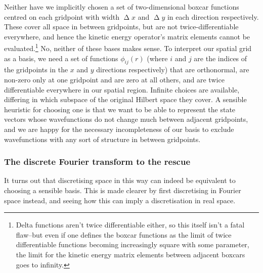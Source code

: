 Neither have we implicitly chosen a set of two-dimensional boxcar functions centred on each gridpoint with width $\upDelta x$ and $\upDelta y$ in each direction respectively. These cover all space in between gridpoints, but are not twice-differentiable everywhere, and hence the kinetic energy operator's matrix elements cannot be evaluated.\footnote{Delta functions aren't twice differentiable either, so this itself isn't a fatal flaw--but even if one defines the boxcar functions as the limit of twice differentiable functions becoming increasingly square with some parameter, the limit for the kinetic energy matrix elements between adjacent boxcars goes to infinity.} No, neither of these bases makes sense. To interpret our spatial grid as a basis, we need a set of functions $\phi_{ij}(r)$ (where $i$ and $j$ are the indices of the gridpoints in the $x$ and $y$ directions respectively) that are orthonormal, are non-zero only at one gridpoint and are zero at all others, and are twice differentiable everywhere in our spatial region. Infinite choices are available, differing in which subspace of the original Hilbert space they cover. A sensible heuristic for choosing one is that we want to be able to represent the state vectors whose wavefunctions do not change much between adjacent gridpoints, and we are happy for the necessary incompleteness of our basis to exclude wavefunctions with any sort of structure in between gridpoints.

\subsubsection{The discrete Fourier transform to the rescue}\label{sec:dft}

It turns out that discretising space in this way can indeed be equivalent to choosing a sensible basis. This is made clearer by first discretising in Fourier space instead, and seeing how this can imply a discretisation in real space.

